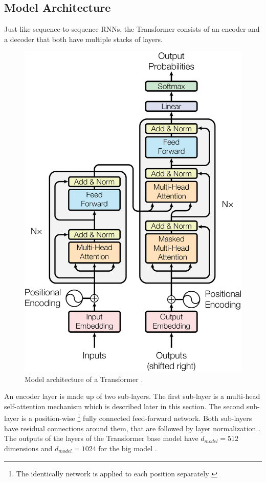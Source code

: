 \subsection{Model Architecture}\label{ssec:transformer-model-architecture}

Just like sequence-to-sequence RNNs, the Transformer consists of an encoder and a decoder that both have multiple stacks of layers.

\begin{figure}[h]
\centering
\includegraphics{figures/transformer-model}
\caption[Model architecture of a Transformer]{Model architecture of a Transformer \cite[p.~3]{1706.03762}.}
\label{fig:transformer-model}
\end{figure}

An encoder layer is made up of two sub-layers.
The first sub-layer is a multi-head self-attention mechanism which is described later in this section.
The second sub-layer is a position-wise \footnote{The identically network is applied to each position separately \cite[p.~5]{1706.03762}} fully connected feed-forward network.
Both sub-layers have residual connections \cite{1512.03385} around them, that are followed by layer normalization \cite{1607.06450}.
The outputs of the layers of the Transformer base model have $d_{model}=512$ dimensions and $d_{model}=1024$ for the big model \cite[p.~9]{1706.03762}.

